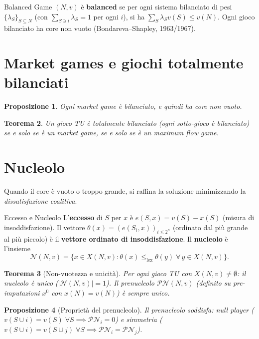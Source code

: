 \documentclass[12pt,a4paper,twoside]{book}
\theoremstyle{plain}
\newtheorem{theorem}{Teorema}[chapter]
\newtheorem{proposition}[theorem]{Proposizione}
\theoremstyle{definition}
\begin{document}
\begin{defbox}{Balanced Game}
$(N,v)$ è \textbf{balanced} se per ogni sistema bilanciato di pesi $\{\lambda_S\}_{S\subseteq N}$ (con $\sum_{S\ni i}\lambda_S=1$ per ogni $i$), si ha $\sum_S\lambda_S v(S)\le v(N)$. Ogni gioco bilanciato ha core non vuoto (Bondareva--Shapley, 1963/1967).
\end{defbox}

\section{Market games e giochi totalmente bilanciati}

\begin{proposition}
Ogni \emph{market game} è bilanciato, e quindi ha core non vuoto.
\end{proposition}

\begin{theorem}
Un gioco TU è totalmente bilanciato (ogni sotto-gioco è bilanciato) se e solo se è un market game, se e solo se è un maximum flow game.
\end{theorem}

\section{Nucleolo}

Quando il core è vuoto o troppo grande, si raffina la soluzione minimizzando la \emph{dissatisfazione coalitiva}.

\begin{defbox}{Eccesso e Nucleolo}
L'\textbf{eccesso} di $S$ per $x$ è $e(S,x)=v(S)-x(S)$ (misura di insoddisfazione). Il vettore $\theta(x)=(e(S_i,x))_{i\le 2^n}$ (ordinato dal più grande al più piccolo) è il \textbf{vettore ordinato di insoddisfazione}. Il \textbf{nucleolo} è l'insieme
\[
  \mathcal{N}(N,v) = \{x\in X(N,v) : \theta(x)\le_{\mathrm{lex}}\theta(y)\;\forall\,y\in X(N,v)\}.
\]
\end{defbox}

\begin{theorem}[Non-vuotezza e unicità]
Per ogni gioco TU con $X(N,v)\ne\emptyset$: il nucleolo è unico ($|\mathcal{N}(N,v)|=1$). Il prenucleolo $\mathcal{PN}(N,v)$ (definito su pre-imputazioni $x^0$ con $x(N)=v(N)$) è sempre unico.
\end{theorem}

\begin{proposition}[Proprietà del prenucleolo]
Il prenucleolo soddisfa: \emph{null player} ($v(S\cup i)=v(S)\;\forall S \implies \mathcal{PN}_i=0$) e \emph{simmetria} ($v(S\cup i)=v(S\cup j)\;\forall S\implies\mathcal{PN}_i=\mathcal{PN}_j$).
\end{proposition}
\end{document}
